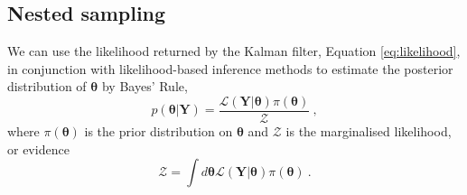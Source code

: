 \documentclass[fleqn,usenatbib,useAMS]{mnras}
\begin{document}


\subsection{Nested sampling}\label{sec:nested_sampling}
We can use the likelihood returned by the Kalman filter, Equation \eqref{eq:likelihood}, in conjunction with likelihood-based inference methods to estimate the posterior distribution of $\boldsymbol{\theta}$ by Bayes' Rule,
\begin{equation}
	p(\boldsymbol{\theta} | \boldsymbol{Y}) = \frac{\mathcal{L}(\boldsymbol{Y} | \boldsymbol{\theta}) \pi(\boldsymbol{\theta})}{\mathcal{Z}} \ ,
\end{equation}
where $\pi(\boldsymbol{\theta})$ is the prior distribution on $\boldsymbol{\theta}$ and $\mathcal{Z}$ is the marginalised likelihood, or evidence
\begin{equation}
	\mathcal{Z} = \int d \boldsymbol{\theta} \mathcal{L}(\boldsymbol{Y} | \boldsymbol{\theta})  \pi(\boldsymbol{\theta})  \ . \label{eq:model_evidence}
\end{equation}
\end{document}
